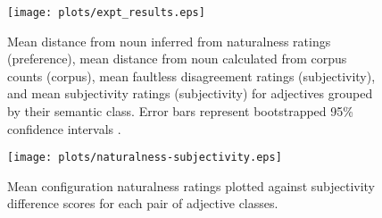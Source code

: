 \documentclass{pnastwo}
\begin{document}
\begin{figure*}
	\centering
	{\texttt{[image: plots/expt\_results.eps]}}\par
	\caption{Mean distance from noun inferred from naturalness ratings (preference), mean distance from noun calculated from corpus counts (corpus),  mean faultless disagreement ratings (subjectivity), and mean subjectivity ratings (subjectivity) for adjectives grouped by their semantic class. Error bars represent bootstrapped 95\% confidence intervals \cite{diciccioefron1996}.}\label{results}
\end{figure*}

\begin{figure}
	\centering\texttt{[image: plots/naturalness-subjectivity.eps]}
	\caption{Mean configuration naturalness ratings plotted against subjectivity difference scores for each pair of adjective classes.}\label{naturalness-subjectivity}
\end{figure}
\end{document}
